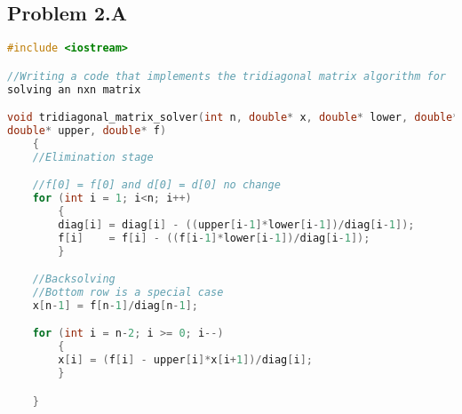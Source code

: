 \documentclass[a4paper,12pt,onecolumn,final]{article}
\begin{document}
\subsection*{Problem 2.A}

\begin{lstlisting}[language=C++]
#include <iostream>

//Writing a code that implements the tridiagonal matrix algorithm for 
solving an nxn matrix

void tridiagonal_matrix_solver(int n, double* x, double* lower, double* diag, 
double* upper, double* f)
    {
    //Elimination stage

    //f[0] = f[0] and d[0] = d[0] no change
    for (int i = 1; i<n; i++)
        {
        diag[i] = diag[i] - ((upper[i-1]*lower[i-1])/diag[i-1]);
        f[i]    = f[i] - ((f[i-1]*lower[i-1])/diag[i-1]);
        }

    //Backsolving
    //Bottom row is a special case
    x[n-1] = f[n-1]/diag[n-1];

    for (int i = n-2; i >= 0; i--)
        {
        x[i] = (f[i] - upper[i]*x[i+1])/diag[i];
        }

    }

\end{lstlisting}%

\end{document}
